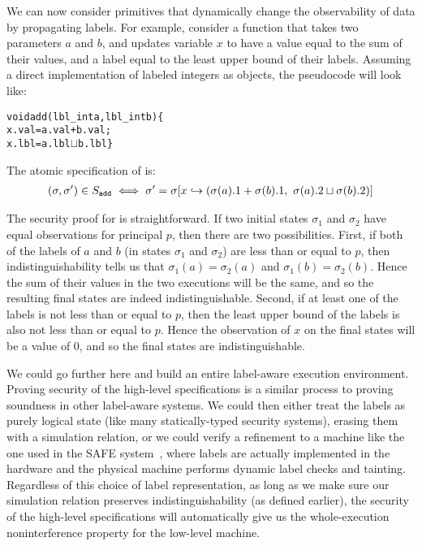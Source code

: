 We can now consider primitives that dynamically change the observability
of data by propagating labels. For example, consider a function 
 that takes two parameters $a$ and $b$, and updates variable $x$ to 
have a value equal to the sum of their values, and a label equal to the least 
upper bound of their labels. Assuming a direct implementation of
labeled integers as objects, the pseudocode will look like:
\newpage
{\small\begin{alltt}
  void add(lbl_int a, lbl_int b) \{
      x.val = a.val + b.val;
      x.lbl = a.lbl \(\sqcup\) b.lbl \}
\end{alltt}}%
\noindent{}The atomic specification of  is:
{\small\begin{align*}
(\sigma,\sigma') \in S_{\text{\tt{add}}} \iff 
\sigma' = 
\sigma[x \hookrightarrow (\sigma(a).1 + \sigma(b).1, \,\, \sigma(a).2 \sqcup \sigma(b).2)]
\end{align*}}%

The security proof for  is straightforward. If two initial
states $\sigma_1$ and $\sigma_2$ have equal observations for principal
$p$, then there are two possibilities.  First, if both of the labels
of $a$ and $b$ (in states $\sigma_1$ and $\sigma_2$) are less than or
equal to $p$, then indistinguishability tells us that $\sigma_1(a)
= \sigma_2(a)$ and $\sigma_1(b) = \sigma_2(b)$. Hence the sum of their
values in the two executions will be the same, and so the resulting
final states are indeed indistinguishable.  Second, if at least one of
the labels is not less than or equal to $p$, then the least upper
bound of the labels is also not less than or equal to $p$. Hence the
observation of $x$ on the final states will be a value of $0$, and so
the final states are indistinguishable.

We could go further here and build an entire label-aware execution
environment. Proving security of the high-level specifications is a
similar process to proving soundness in other label-aware systems. We
could then either treat the labels as purely logical state (like many
statically-typed security systems), erasing them with a simulation
relation, or we could verify a refinement to a machine like the one
used in the SAFE system~\cite{safe}, where labels are actually
implemented in the hardware and the physical machine performs dynamic
label checks and tainting. Regardless of this choice of label
representation, as long as we make sure our simulation relation
preserves indistinguishability (as defined earlier), the security of 
the high-level specifications
will automatically give us the whole-execution noninterference
property for the low-level machine.

